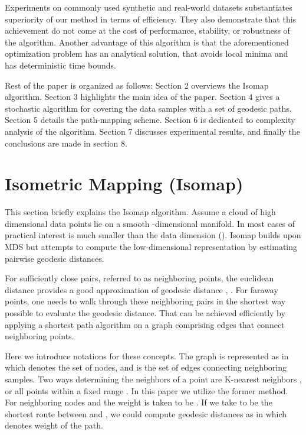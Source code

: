 \documentclass[10pt,journal,cspaper,compsoc]{IEEEtran}
\begin{document}
Experiments on commonly used synthetic and real-world datasets substantiates superiority of our method in terms of efficiency. They also demonstrate that this achievement do not come at the cost of performance, stability, or robustness of the algorithm. Another advantage of this algorithm is that the aforementioned optimization problem has an analytical solution, that avoids local minima and has deterministic time bounds.

Rest of the paper is organized as follows: Section 2 overviews the Isomap algorithm. Section 3 highlights the main idea of the paper. Section 4 gives a stochastic algorithm for covering the data samples with a set of geodesic paths. Section 5 details the path-mapping scheme. Section 6 is dedicated to complexity analysis of the algorithm. Section 7 discusses experimental results, and finally the conclusions are made in section 8.




\section{Isometric Mapping (Isomap)}
This section briefly explains the Isomap algorithm. Assume a cloud of high dimensional data points  lie on a smooth -dimensional manifold. In most cases of practical interest  is  much smaller than the data dimension  (). Isomap builds upon MDS but attempts to compute the low-dimensional representation by estimating pairwise geodesic distances.

For sufficiently close pairs, referred to as neighboring points, the euclidean distance provides a good approximation of geodesic distance \cite{bernstein2000graph}, \cite{balasubramanian2002isomap}. For faraway points, one needs to walk through these neighboring pairs in the shortest way possible to evaluate the geodesic distance. That can be achieved efficiently by applying a shortest path algorithm on a graph comprising edges that connect neighboring points.

Here we introduce notations for these concepts. The graph is represented as  in which  denotes the set of nodes, and  is the set of edges connecting neighboring samples. Two ways determining the neighbors of a point are K-nearest neighbors \cite{seidl1998optimal}, or all points within a fixed range . In this paper we utilize the former method. For neighboring nodes  and  the weight is taken to be . If we take  to be the shortest route between  and , we could compute geodesic distances as  in which  denotes weight of the path.
\end{document}

